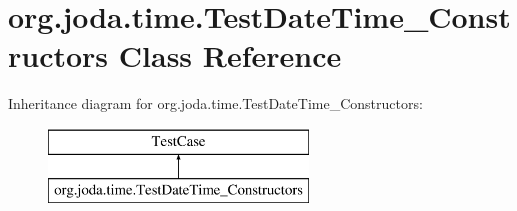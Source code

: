 \hypertarget{classorg_1_1joda_1_1time_1_1_test_date_time___constructors}{\section{org.\-joda.\-time.\-Test\-Date\-Time\-\_\-\-Constructors Class Reference}
\label{classorg_1_1joda_1_1time_1_1_test_date_time___constructors}
}
Inheritance diagram for org.\-joda.\-time.\-Test\-Date\-Time\-\_\-\-Constructors\-:\begin{figure}[H]
\begin{center}
\leavevmode
\includegraphics[height=2.000000cm]{classorg_1_1joda_1_1time_1_1_test_date_time___constructors}
\end{center}
\end{figure}
